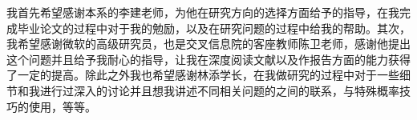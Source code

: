 

\begin{ack}

我首先希望感谢本系的李建老师，为他在研究方向的选择方面给予的指导，在我完成毕业论文的过程中对于我的勉励，以及在研究问题的过程中给我的帮助。其次，我希望感谢微软的高级研究员，也是交叉信息院的客座教师陈卫老师，感谢他提出这个问题并且给予我耐心的指导，让我在深度阅读文献以及作报告方面的能力获得了一定的提高。除此之外我也希望感谢林添学长，在我做研究的过程中对于一些细节和我进行过深入的讨论并且想我讲述不同相关问题的之间的联系，与特殊概率技巧的使用，等等。


\end{ack}
